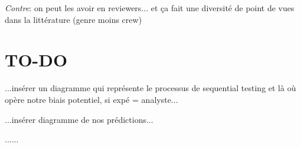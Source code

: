 \documentclass[a4paper,man,natbib]{apa6}
\begin{document}
\emph{Contre}: on peut les avoir en reviewers... et ça fait une diversité de point de vues dans la littérature (genre moins crew)

\section{TO-DO}

...insérer un diagramme qui représente le processus de sequential testing et là où opère notre biais potentiel, si expé = analyste...

...insérer diagramme de nos prédictions...


...\cite{kruschke_bayesian_2017}...



\end{document}
